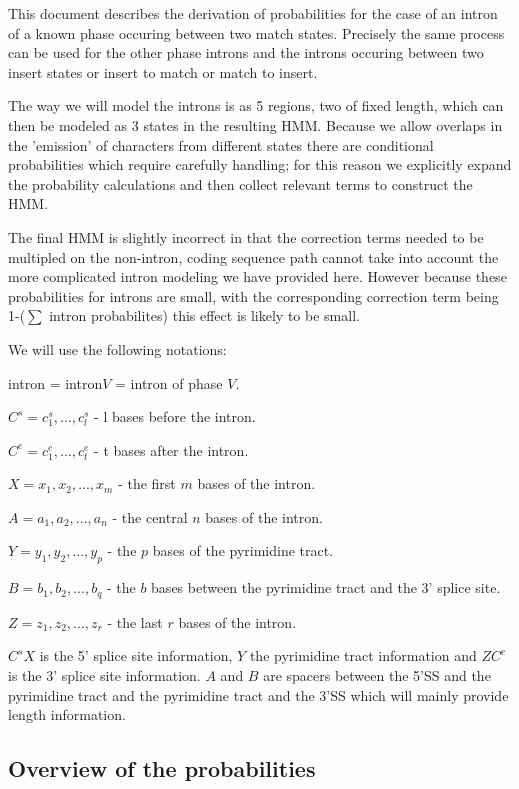 This document describes the derivation of probabilities for the
case of an intron of a known phase occuring between two match states.
Precisely the same process can be used for the other phase introns
and the introns occuring between two insert states or insert to match or
match to insert.

The way we will model the introns is as 5 regions, two of fixed length,
which can then be modeled as 3 states in the resulting HMM. Because we
allow overlaps in the 'emission' of characters from different states there
are conditional probabilities which require carefully handling; for this
reason we explicitly expand the probability calculations and then collect
relevant terms to construct the HMM.

The final HMM is slightly incorrect in that the correction terms needed to
be multipled on the non-intron, coding sequence path cannot take into
account the more complicated intron modeling we have provided here. However
because these probabilities for introns are small, with the corresponding correction
term being 1-($\sum$ intron probabilites) this effect is likely to be small.

We will use the following notations:

\begin{description}
\item intron = intron$V$ = intron of phase $V$.
\item $C^s = c^s_1,...,c^s_l$ - l bases before the intron.
\item $C^e = c^e_1,...,c^e_t$ - t bases after the intron.
\item $X = x_1,x_2,...,x_m$ - the first $m$ bases of the intron.
\item $A = a_1,a_2,...,a_n$ - the central $n$ bases of the intron.
\item $Y = y_1,y_2,...,y_p$ - the $p$ bases of the pyrimidine tract.
\item $B = b_1,b_2,...,b_q$ - the $b$ bases between the pyrimidine tract
and the 3' splice site.
\item $Z = z_1,z_2,...,z_r$ - the last $r$ bases of the intron.
\end{description}

$C^sX$ is the 5' splice site information, $Y$ the pyrimidine
tract information and $ZC^e$ is the 3' splice
site information. $A$ and $B$ are spacers between the 5'SS and
the pyrimidine tract and the pyrimidine tract and the 3'SS which
will mainly provide length information.

\subsection{Overview of the probabilities}

